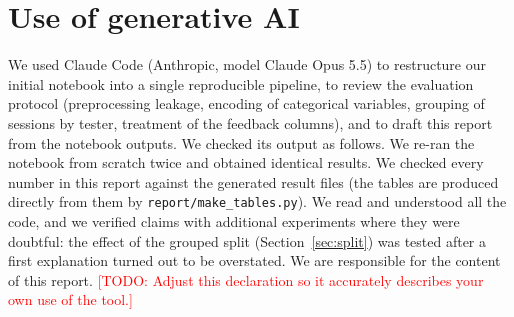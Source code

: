 \documentclass[11pt,a4paper]{article}
\newcommand{\todo}[1]{\textcolor{red}{[TODO: #1]}}
\newcommand{\code}[1]{\texttt{#1}}
\begin{document}
\section*{Use of generative AI}
We used Claude Code (Anthropic, model Claude Opus 5.5) to restructure our initial notebook into a single
reproducible pipeline, to review the evaluation protocol (preprocessing leakage, encoding of categorical
variables, grouping of sessions by tester, treatment of the feedback columns), and to draft this report from
the notebook outputs.
We checked its output as follows. We re-ran the notebook from scratch twice and obtained identical results.
We checked every number in this report against the generated result files (the tables are produced
directly from them by \code{report/make\_tables.py}). We read and understood all the code, and we verified
claims with additional experiments where they were doubtful: the effect of the grouped split
(Section~\ref{sec:split}) was tested after a first explanation turned out to be overstated. We are
responsible for the content of this report.
\todo{Adjust this declaration so it accurately describes your own use of the tool.}



\end{document}
